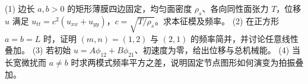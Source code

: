 (1) 边长 \(a,b>0\) 的矩形薄膜四边固定，均匀面密度 \(\rho_s\)、各向同性面张力 \(T\)，位移 \(u\) 满足 \(u_{tt}=c^2(u_{xx}+u_{yy})\)，\(c=\sqrt{T/\rho_s}\)。求本征模及频率。
(2) 在正方形 \(a=b=L\) 时，证明 \((m,n)=(1,2)\) 与 \((2,1)\) 的频率简并，并讨论任意线性叠加。
(3) 若初始 \(u=A\phi_{12}+B\phi_{21}\)、初速度为零，给出位移与总机械能。
(4) 当长宽微扰而 \(a\ne b\) 时求两模式频率平方之差，说明固定节点图形如何演变为拍振叠加。
